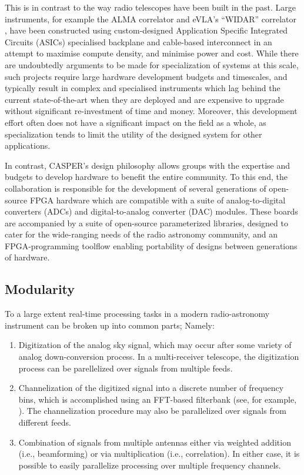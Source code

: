 \documentclass{ws-jai}
\begin{document}
This is in contrast to the way radio telescopes have been built in the past.
Large instruments, for example the ALMA correlator \citep{alma-correlator} and
eVLA's ``WIDAR'' correlator \citep{evla}, have been constructed using
custom-designed Application Specific Integrated Circuits (ASICs) specialised
backplane and cable-based interconnect in an attempt to maximise compute
density, and minimise power and cost. While there are undoubtedly arguments to be made for specialization of systems at this scale, such projects require large
hardware development budgets and timescales, and typically result in complex
and specialised instruments which lag behind the current state-of-the-art when they are deployed and are expensive to upgrade without significant
re-investment of time and money. Moreover, this development effort often does not have a significant impact on the field as a whole, as specialization tends to limit the utility of the designed system for other applications.

In contrast, CASPER's design philosophy allows groups with the expertise and
budgets to develop hardware to benefit the entire community. To this end, the collaboration
is responsible for the development of several generations of open-source FPGA hardware which are compatible with a suite of analog-to-digital converters (ADCs) and digital-to-analog converter (DAC) modules. These boards are accompanied by a suite of open-source parameterized libraries, designed to cater for the wide-ranging needs of the radio astronomy community, and an FPGA-programming toolflow enabling portability of designs between generations of hardware.



\subsection{Modularity}

To a large extent real-time processing tasks in a modern
radio-astronomy instrument can be broken up into common parts; Namely:
\begin{enumerate}
    \item Digitization of the analog sky signal, which may occur after
    some variety of analog down-conversion process. In a multi-receiver telescope, the digitization process can be parellelized over signals from multiple feeds.
    
    \item Channelization of the digitized signal into a discrete number of
    frequency bins, which is accomplished using an FFT-based filterbank
    (see, for example, \citet{specbook}). The channelization procedure may also be parallelized over signals from different feeds.
    
    \item Combination of signals from multiple antennas either via weighted addition (i.e., beamforming) or via multiplication (i.e.,
    correlation). In either case, it is possible to easily parallelize processing
    over multiple frequency channels.
\end{enumerate}
\end{document}
